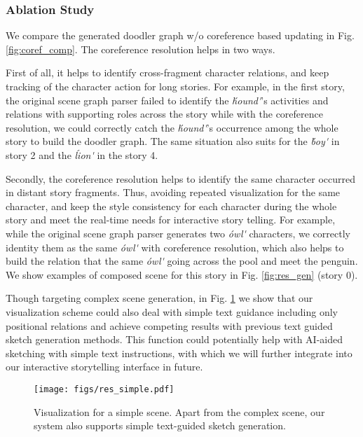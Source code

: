 \subsubsection{Ablation Study}
We compare the generated doodler graph w/o coreference based updating in Fig. \ref{fig:coref_comp}. The coreference resolution helps in two ways. 

First of all, it helps to identify cross-fragment character relations, and keep tracking of the character action for long stories. For example, in the first story, the original scene graph parser failed to identify the  \textit{\'hound\'}'s activities and relations with supporting roles across the story while with the coreference resolution, we could correctly catch the \textit{\'hound\'}'s occurrence among the whole story to build the doodler graph. The same situation also suits for the \textit{\'boy\'} in story 2 and the \textit{\'lion\'} in the story 4.

Secondly, the coreference resolution helps to identify the same character occurred in distant story fragments. Thus, avoiding repeated visualization for the same character, and keep the style consistency for each character during the whole story and meet the real-time needs for interactive story telling. For example, while the original scene graph parser generates two \textit{\'owl\'} characters, we correctly identity them as the same \textit{\'owl\'} with coreference resolution, which also helps to build the relation that the same \textit{\'owl\'} going across the pool and meet the penguin. We show examples of composed scene for this story in Fig. \ref{fig:res_gen} (story 0).


Though targeting complex scene generation, in Fig. \ref{fig:res_simple} we show that our visualization scheme could also deal with simple text guidance including only positional relations and achieve competing results with previous text guided sketch generation methods\cite{Huang2019}. This function could potentially help with AI-aided sketching with simple text instructions, with which we will further integrate into our interactive storytelling interface in future.

\begin{figure}[t!]
\begin{center}
   \texttt{[image: figs/res\_simple.pdf]}
\end{center}
\caption{Visualization for a simple scene. Apart from the complex scene, our system also supports simple text-guided sketch generation.}
\label{fig:res_simple}
\end{figure}